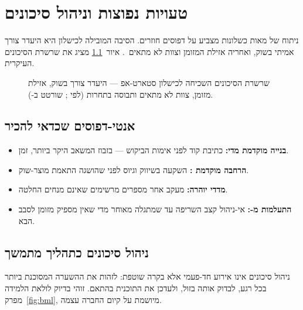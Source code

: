 \chapter{טעויות נפוצות וניהול סיכונים}

ניתוח של מאות כשלונות מצביע על דפוסים חוזרים. הסיבה המובילה לכישלון היא
היעדר צורך אמיתי בשוק, ואחריה אזילת המזומן וצוות לא מתאים~\cite{cbinsights2021}.
איור~\ref{fig:risks} מציג את שרשרת הסיכונים העיקרית.

\begin{figure}[htbp]
  \centering
  \caption{שרשרת הסיכונים השכיחה לכישלון סטארט-אפ — היעדר צורך בשוק, אזילת מזומן,
  צוות לא מתאים ותבוסה בתחרות (לפי ; שורטט ב-).}
  \label{fig:risks}
\end{figure}

\section{אנטי-דפוסים שכדאי להכיר}

\begin{itemize}
  \item \textbf{בנייה מוקדמת מדי:} כתיבת קוד לפני אימות הביקוש — בזבוז המשאב
        היקר ביותר, זמן.
  \item \textbf{הרחבה מוקדמת :} השקעה בשיווק וגיוס
        לפני שהושגה התאמת מוצר-שוק.
  \item \textbf{מדדי יוהרה:} מעקב אחר מספרים מרשימים שאינם מנחים החלטה.
  \item \textbf{התעלמות מ-:} אי-ניהול קצב השריפה עד שמתגלה מאוחר
        מדי שאין מספיק מזומן לסבב הבא.
\end{itemize}

\section{ניהול סיכונים כתהליך מתמשך}

ניהול סיכונים אינו אירוע חד-פעמי אלא בקרה שוטפת: לזהות את ההשערה המסוכנת ביותר
בכל רגע, לבדוק אותה בזול, ולעדכן את התוכנית בהתאם. זוהי בדיוק לולאת הלמידה
מפרק~\ref{fig:bml}, מיושמת על קיום החברה עצמה.
